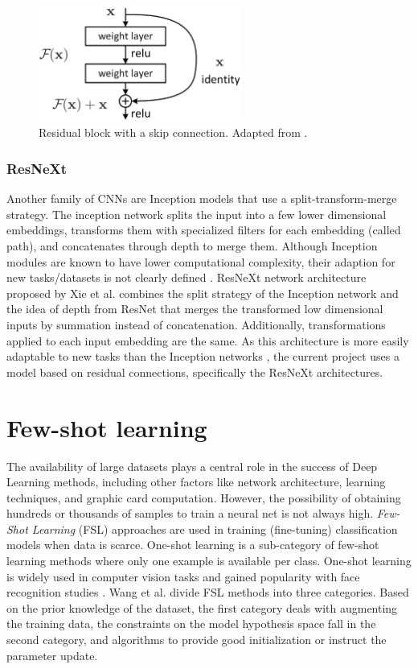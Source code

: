 \begin{figure}[ht]
\centering
\includegraphics[width=0.6\textwidth]{images/resnet/resnet.png}
  \caption{Residual block with a skip connection. Adapted from \cite{He2016DeepRL}.}
  \label{fig:resnet}
\end{figure}

\subsubsection{ResNeXt}

Another family of CNNs are Inception models that use a split-transform-merge strategy. The inception network splits the input into a few lower dimensional embeddings, transforms them with specialized filters for each embedding (called path), and concatenates through depth to merge them. Although Inception modules are known to have lower computational complexity, their adaption for new tasks/datasets is not clearly defined \cite{Xie2016}. ResNeXt network architecture proposed by Xie et al. \cite{Xie2016} combines the split strategy of the Inception network and the idea of depth from ResNet \cite{He2016DeepRL} that merges the transformed low dimensional inputs by summation instead of concatenation. Additionally, transformations applied to each input embedding are the same. As this architecture is more easily adaptable to new tasks than the Inception networks \cite{Xie2016}, the current project uses a model based on residual connections, specifically the ResNeXt architectures.

\section{Few-shot learning}

The availability of large datasets plays a central role in the success of Deep Learning methods, including other factors like network architecture, learning techniques, and graphic card computation. However, the possibility of obtaining hundreds or thousands of samples to train a neural net is not always high. \emph{Few-Shot Learning} (FSL) approaches are used in training (fine-tuning) classification models when data is scarce. One-shot learning is a sub-category of few-shot learning methods where only one example is available per class. One-shot learning is widely used in computer vision tasks and gained popularity with face recognition studies \cite{koch2015siamese}. Wang et al. \cite{Wang2020FSL} divide FSL methods into three categories. Based on the prior knowledge of the dataset, the first category deals with augmenting the training data, the constraints on the model hypothesis space fall in the second category, and algorithms to provide good initialization or instruct the parameter update. 


